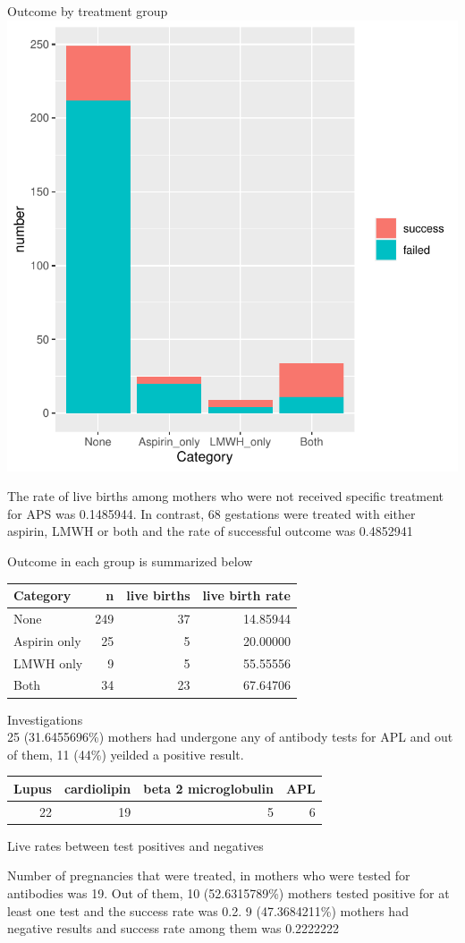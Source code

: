 \documentclass[
]{article}
\begin{document}
Outcome by treatment group \includegraphics{Figs/unnamed-chunk-30-1.pdf}

The rate of live births among mothers who were not received specific
treatment for APS was 0.1485944. In contrast, 68 gestations were treated
with either aspirin, LMWH or both and the rate of successful outcome was
0.4852941

Outcome in each group is summarized below

\begin{longtable}[]{@{}lrrr@{}}
\toprule
Category & n & live births & live birth rate\tabularnewline
\midrule
\endhead
None & 249 & 37 & 14.85944\tabularnewline
Aspirin only & 25 & 5 & 20.00000\tabularnewline
LMWH only & 9 & 5 & 55.55556\tabularnewline
Both & 34 & 23 & 67.64706\tabularnewline
\bottomrule
\end{longtable}

Investigations\\
25 (31.6455696\%) mothers had undergone any of antibody tests for APL
and out of them, 11 (44\%) yeilded a positive result.

\begin{longtable}[]{@{}rrrr@{}}
\toprule
Lupus & cardiolipin & beta 2 microglobulin & APL\tabularnewline
\midrule
\endhead
22 & 19 & 5 & 6\tabularnewline
\bottomrule
\end{longtable}

Live rates between test positives and negatives

Number of pregnancies that were treated, in mothers who were tested for
antibodies was 19. Out of them, 10 (52.6315789\%) mothers tested
positive for at least one test and the success rate was 0.2. 9
(47.3684211\%) mothers had negative results and success rate among them
was 0.2222222

~~
\end{document}
